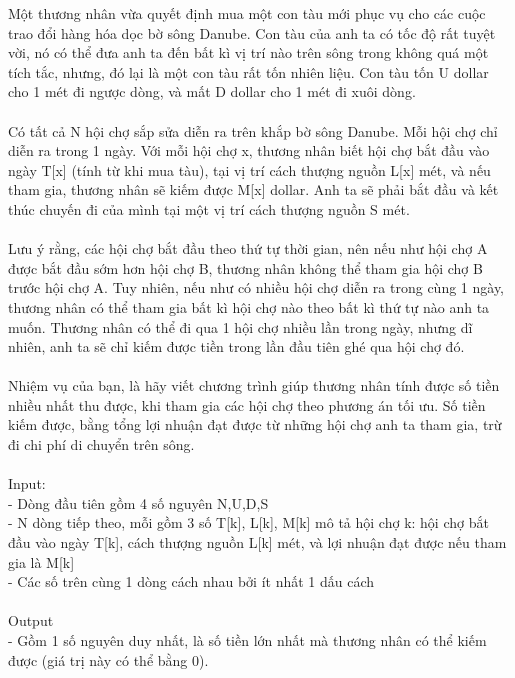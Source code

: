 



   Một thương nhân vừa quyết định mua một con tàu mới phục vụ cho các cuộc trao đổi hàng hóa dọc bờ sông Danube. Con tàu của anh ta có tốc độ rất tuyệt vời, nó có thể đưa anh ta đến bất kì vị trí nào trên sông trong không quá một tích tắc, nhưng, đó lại là một con tàu rất tốn nhiên liệu. Con tàu tốn U dollar cho 1 mét đi ngược dòng, và mất D dollar cho 1 mét đi xuôi dòng.   
\\
\\   Có tất cả N hội chợ sắp sửa diễn ra trên khắp bờ sông Danube. Mỗi hội chợ chỉ diễn ra trong 1 ngày. Với mỗi hội chợ x, thương nhân biết hội chợ bắt đầu vào ngày T[x] (tính từ khi mua tàu), tại vị trí cách thượng nguồn L[x] mét, và nếu tham gia, thương nhân sẽ kiếm được M[x] dollar. Anh ta sẽ phải bắt đầu và kết thúc chuyến đi của mình tại một vị trí cách thượng nguồn S mét.   
\\
\\   Lưu ý rằng, các hội chợ bắt đầu theo thứ tự thời gian, nên nếu như hội chợ A được bắt đầu sớm hơn hội chợ B, thương nhân không thể tham gia hội chợ B trước hội chợ A. Tuy nhiên, nếu như có nhiều hội chợ diễn ra trong cùng 1 ngày, thương nhân có thể tham gia bất kì hội chợ nào theo bất kì thứ tự nào anh ta muốn. Thương nhân có thể đi qua 1 hội chợ nhiều lần trong ngày, nhưng dĩ nhiên, anh ta sẽ chỉ kiếm được tiền trong lần đầu tiên ghé qua hội chợ đó.   
\\
\\   Nhiệm vụ của bạn, là hãy viết chương trình giúp thương nhân tính được số tiền nhiều nhất thu được, khi tham gia các hội chợ theo phương án tối ưu. Số tiền kiếm được, bằng tổng lợi nhuận đạt được từ những hội chợ anh ta tham gia, trừ đi chi phí di chuyển trên sông.   
\\
\\   Input:   
\\   - Dòng đầu tiên gồm 4 số nguyên N,U,D,S   
\\   - N dòng tiếp theo, mỗi gồm 3 số T[k], L[k], M[k] mô tả hội chợ k: hội chợ bắt đầu vào ngày T[k], cách thượng nguồn L[k] mét, và lợi nhuận đạt được nếu tham gia là M[k]   
\\   - Các số trên cùng 1 dòng cách nhau bởi ít nhất 1 dấu cách   
\\
\\   Output   
\\   - Gồm 1 số nguyên duy nhất, là số tiền lớn nhất mà thương nhân có thể kiếm được (giá trị này có thể bằng 0).   
\\

